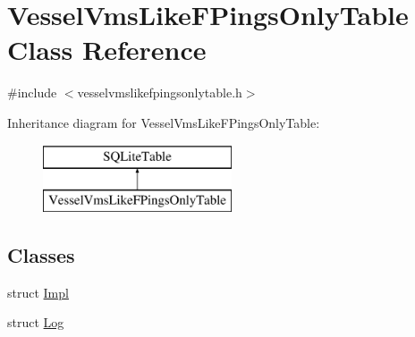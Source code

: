 \hypertarget{class_vessel_vms_like_f_pings_only_table}{}\section{Vessel\+Vms\+Like\+F\+Pings\+Only\+Table Class Reference}
\label{class_vessel_vms_like_f_pings_only_table}


{\ttfamily \#include $<$vesselvmslikefpingsonlytable.\+h$>$}

Inheritance diagram for Vessel\+Vms\+Like\+F\+Pings\+Only\+Table\+:\begin{figure}[H]
\begin{center}
\leavevmode
\includegraphics[height=2.000000cm]{db/ddc/class_vessel_vms_like_f_pings_only_table}
\end{center}
\end{figure}
\subsection*{Classes}
\begin{DoxyCompactItemize}
\item 
struct \mbox{\hyperlink{struct_vessel_vms_like_f_pings_only_table_1_1_impl}{Impl}}
\item 
struct \mbox{\hyperlink{struct_vessel_vms_like_f_pings_only_table_1_1_log}{Log}}
\end{DoxyCompactItemize}
